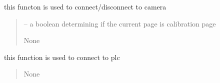 \documentclass[letterpaper,10pt,english]{sphinxmanual}
\begin{document}
\begin{savenotes}
\begin{fulllineitems}
\begin{savenotes}
\begin{fulllineitems}
\begin{quote}
\begin{description}
\end{description}\end{quote}

\end{fulllineitems}\end{savenotes}


\begin{savenotes}\begin{fulllineitems}
\label{\detokenize{setting/setting_api:oxin.setting_api.API.connect_dissconnect_to_camera}}
\pysigstartsignatures
{}
\pysigstopsignatures
\sphinxAtStartPar
this functon is used to connect/disconnect to camera
\begin{quote}\begin{description}
\sphinxAtStartPar
{} – a boolean determining if the current page is calibration page

\sphinxAtStartPar
None

\end{description}\end{quote}

\end{fulllineitems}\end{savenotes}


\begin{savenotes}\begin{fulllineitems}
\label{\detokenize{setting/setting_api:oxin.setting_api.API.connect_plc}}
\pysigstartsignatures
{}
\pysigstopsignatures
\sphinxAtStartPar
this function is used to connect to plc
\begin{quote}\begin{description}
\sphinxAtStartPar
None

\end{description}\end{quote}


\end{fulllineitems}
\end{savenotes}
\end{fulllineitems}
\end{savenotes}
\end{document}
